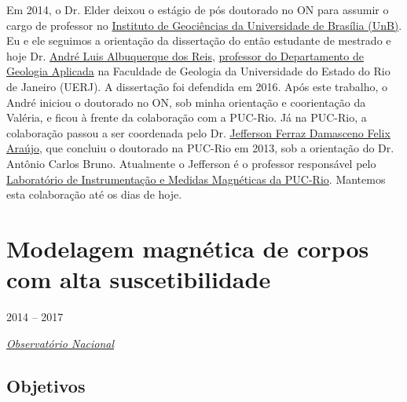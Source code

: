 Em 2014, o Dr. Elder deixou o estágio de pós doutorado no ON para assumir o cargo de
professor no 
\href{http://www.pesquisar.unb.br/professor/elder-yokoyama}{Instituto de Geociências da Universidade de Brasília (UnB)}. 
Eu e ele seguimos a orientação da dissertação do então estudante de mestrado e hoje
Dr. \href{https://lattes.cnpq.br/1075610796165589}{André Luis Albuquerque dos Reis},
\href{https://www.fgel.uerj.br/site/departamentos/depto-de-geologia-aplicada/dgap-quadro-de-pessoal/}{professor do Departamento de Geologia Aplicada} 
na Faculdade de Geologia da Universidade do
Estado do Rio de Janeiro (UERJ). A dissertação foi defendida em 2016.
Após este trabalho, o André iniciou o doutorado no ON, sob minha orientação e
coorientação da Valéria, e ficou à frente da colaboração com a PUC-Rio. 
Já na PUC-Rio, a colaboração passou a ser coordenada pelo Dr. \href{https://lattes.cnpq.br/0190128964748843}{Jefferson Ferraz Damasceno
Felix Araújo}, que concluiu o doutorado na PUC-Rio em 2013, sob a orientação do 
Dr. Antônio Carlos Bruno. Atualmente o Jefferson é o professor responsável pelo 
\href{https://www.fis.puc-rio.br/instrumentacao-e-medidas-magneticas/}{Laboratório de Instrumentação e Medidas Magnéticas da PUC-Rio}.
Mantemos esta colaboração até os dias de hoje.



\section{Modelagem magnética de corpos com alta suscetibilidade} 
\label{sec:projeto-Diego}

 2014 -- 2017
\vspace{0.3\baselineskip}\\
\noindent\parbox{0.03\textwidth}{\vspace{-0.2\baselineskip}\faUniversity} \href{https://www.gov.br/observatorio/pt-br}{\textsl{Observatório Nacional}}
\parbox{0.03\textwidth}{\vspace{-0.2\baselineskip} \hfill {}}

\subsection*{Objetivos}

